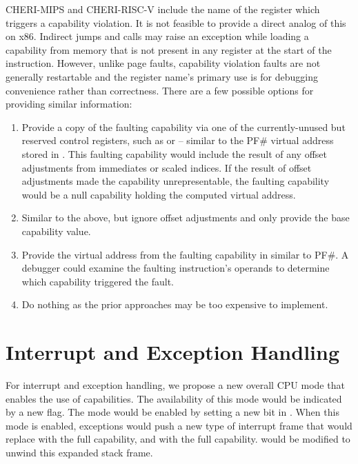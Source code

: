 CHERI-MIPS and CHERI-RISC-V include the name of the register which
triggers a capability violation.  It is not feasible to provide a
direct analog of this on x86.  Indirect jumps and calls may raise an
exception while loading a capability from memory that is not present
in any register at the start of the instruction.  However, unlike page
faults, capability violation faults are not generally restartable and
the register name's primary use is for debugging convenience rather than
correctness.  There are a few possible options for providing similar
information:

\begin{enumerate}
\item Provide a copy of the faulting capability via one of the
  currently-unused but reserved control registers, such as \CRFIVE{}
  or \CRTWELVE{} -- similar to the PF\# virtual address stored in
  \CRTWO{}.  This faulting capability would include the result of any
  offset adjustments from immediates or scaled indices.  If the result
  of offset adjustments made the capability unrepresentable, the
  faulting capability would be a null capability holding the computed
  virtual address.
\item Similar to the above, but ignore offset adjustments and only
  provide the base capability value.
\item Provide the virtual address from the faulting capability in
  \CRTWO{} similar to PF\#.  A debugger could examine the faulting
  instruction's operands to determine which capability triggered the fault.
\item Do nothing as the prior approaches may be too expensive to
  implement.
\end{enumerate}

\section{Interrupt and Exception Handling}

For interrupt and exception handling, we propose a new overall CPU
mode that enables the use of capabilities.  The availability of this
mode would be indicated by a new  flag.  The
mode would be enabled by setting a new bit in \CRFOUR{}.  When this mode
is enabled, exceptions would push a new type of interrupt frame that
would replace \RIP{} with the full \CIP{} capability, and \RSP{} with the full
\CSP{} capability.   would be modified to unwind this expanded stack
frame.

